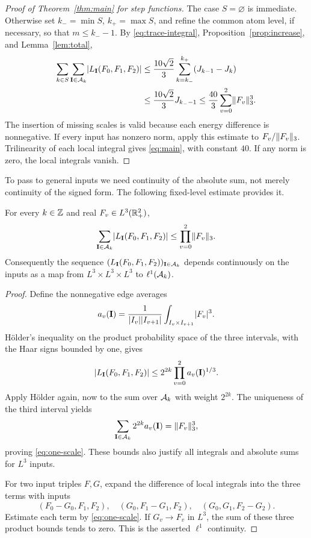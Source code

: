 \begin{proof}[Proof of Theorem~\ref{thm:main} for step functions]
The case \(S=\varnothing\) is immediate. Otherwise set
\(k_-=\min S\), \(k_+=\max S\), and refine the common atom level,
if necessary, so that \(m\le k_--1\). By \eqref{eq:trace-integral},
Proposition~\ref{prop:increase}, and Lemma~\ref{lem:total},
\begin{align*}
 \sum_{k\in S}\sum_{\mathbf I\in\mathcal A_k}\lvert L_{\mathbf I}(F_0,F_1,F_2)\rvert
 &\le\frac{10\sqrt2}{3}
       \sum_{k=k_-}^{k_+}(J_{k-1}-J_k)\\
 &\le\frac{10\sqrt2}{3}J_{k_--1}
 \le\frac{40}{3}\sum_{v=0}^2\lVert F_v\rVert_3^3.
\end{align*}
The insertion of missing scales is valid because each energy
difference is nonnegative. If every input has nonzero norm, apply
this estimate to \(F_v/\lVert F_v\rVert_3\). Trilinearity of each local
integral gives \eqref{eq:main}, with constant \(40\).
If any norm is zero, the local integrals vanish.
\end{proof}

To pass to general inputs we need continuity of the absolute sum,
not merely continuity of the signed form. The following fixed-level
estimate provides it.

\begin{lemma}\label{lem:continuity}
For every \(k\in\mathbb Z\) and real \(F_v\in L^3(\mathbb R_+^2)\),
\begin{equation}\label{eq:one-scale}
 \sum_{\mathbf I\in\mathcal A_k}\lvert L_{\mathbf I}(F_0,F_1,F_2)\rvert
       \le\prod_{v=0}^2\lVert F_v\rVert_3.
\end{equation}
Consequently the sequence
\((L_{\mathbf I}(F_0,F_1,F_2))_{\mathbf I\in\mathcal A_k}\) depends
continuously on the inputs as a map from \(L^3\times L^3\times L^3\)
to \(\ell^1(\mathcal A_k)\).
\end{lemma}

\begin{proof}
Define the nonnegative edge averages
\[
 a_v(\mathbf I)=
 \frac1{\lvert I_v\rvert\lvert I_{v+1}\rvert}
            \int_{I_v\times I_{v+1}}\lvert F_v\rvert^3.
\]
H\"older's inequality on the product probability space of the three
intervals, with the Haar signs bounded by one, gives
\[
 \lvert L_{\mathbf I}(F_0,F_1,F_2)\rvert
       \le2^{2k}\prod_{v=0}^2 a_v(\mathbf I)^{1/3}.
\]
Apply H\"older again, now to the sum over \(\mathcal A_k\) with weight
\(2^{2k}\). The uniqueness of the third interval yields
\[
 \sum_{\mathbf I\in\mathcal A_k}2^{2k}a_v(\mathbf I)=\lVert F_v\rVert_3^3,
\]
proving \eqref{eq:one-scale}. These bounds also justify all integrals
and absolute sums for \(L^3\) inputs.

For two input triples \(F,G\), expand the difference of local
integrals into the three terms with inputs
\[
 (F_0-G_0,F_1,F_2),\quad
 (G_0,F_1-G_1,F_2),\quad
 (G_0,G_1,F_2-G_2).
\]
Estimate each term by \eqref{eq:one-scale}. If \(G_v\to F_v\) in
\(L^3\), the sum of these three product bounds tends to zero.
This is the asserted \(\ell^1\) continuity.
\end{proof}

